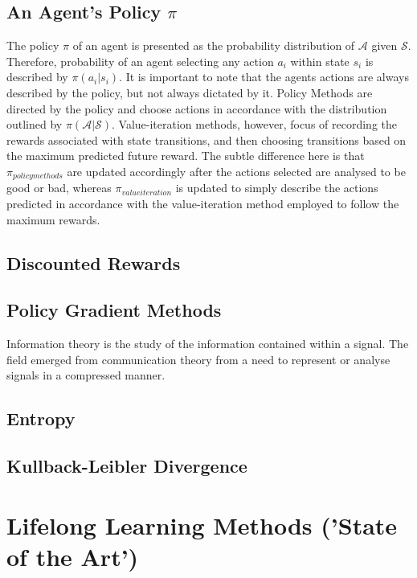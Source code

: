 \subsection{An Agent's Policy $\pi$}
The policy $\pi$ of an agent is presented as the probability distribution of $\mathcal{A}$ given $\mathcal{S}$. Therefore, probability of an agent selecting any action $a_i$ within state $s_i$ is described by $\pi(a_i | s_i)$. It is important to note that the agents actions are always described by the policy, but not always dictated by it. Policy Methods are directed by the policy and choose actions in accordance with the distribution outlined by $\pi(\mathcal{A} | \mathcal{S})$. Value-iteration methods, however, focus of recording the rewards associated with state transitions, and then choosing transitions based on the maximum predicted future reward. The subtle difference here is that $\pi_{policy methods}$ are updated accordingly after the actions selected are analysed to be good or bad, whereas $\pi_{value iteration}$ is updated to simply describe the actions predicted in accordance with the value-iteration method employed to follow the maximum rewards. 

\subsection{Discounted Rewards}
 
\subsection{Policy Gradient Methods}

Information theory is the study of the information contained within a signal. The field emerged from communication theory from a need to represent or analyse signals in a compressed manner. 

\subsection{Entropy}

\subsection{Kullback-Leibler Divergence}

\section{Lifelong Learning Methods ('State of the Art')}


